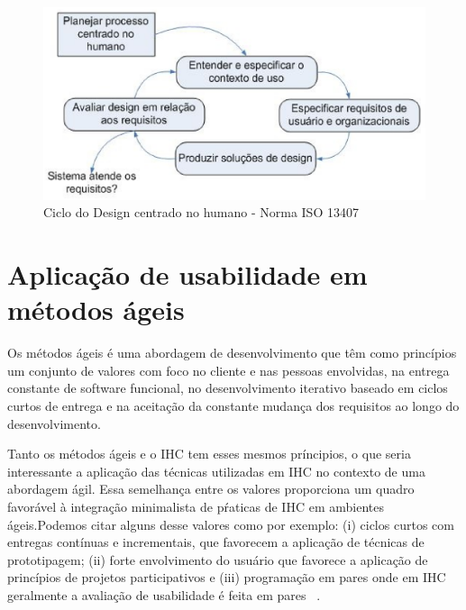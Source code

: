 \begin{figure}[h]
    \centering
    \includegraphics[keepaspectratio=true,scale=0.60]
      {figuras/ciclo_iso13407.eps}
    \caption{Ciclo do Design centrado no humano - Norma ISO 13407~\cite{iso13407}}
    \label{ciclo_iso13407}
\end{figure}




\section{Aplicação de usabilidade em métodos ágeis}
	
	Os métodos ágeis é uma abordagem de desenvolvimento que têm como princípios um conjunto de valores com foco no cliente e nas pessoas envolvidas, na entrega constante de software funcional, no desenvolvimento iterativo baseado em ciclos curtos de entrega e na aceitação da constante mudança dos requisitos ao longo do desenvolvimento. 

	Tanto os métodos ágeis e o IHC tem esses mesmos príncipios, o que seria interessante a aplicação das técnicas utilizadas em IHC no contexto de uma abordagem ágil. Essa semelhança entre os valores proporciona um quadro favorável à integração minimalista de pŕaticas de IHC em ambientes ágeis.Podemos citar alguns desse valores como por exemplo: (i) ciclos curtos com entregas contínuas e incrementais, que favorecem a aplicação de técnicas de prototipagem; (ii) forte envolvimento do usuário que favorece a aplicação de princípios de projetos participativos e (iii) programação em pares onde em IHC geralmente a avaliação de usabilidade é feita em pares ~\cite{barbosa2008estrategia}. 

